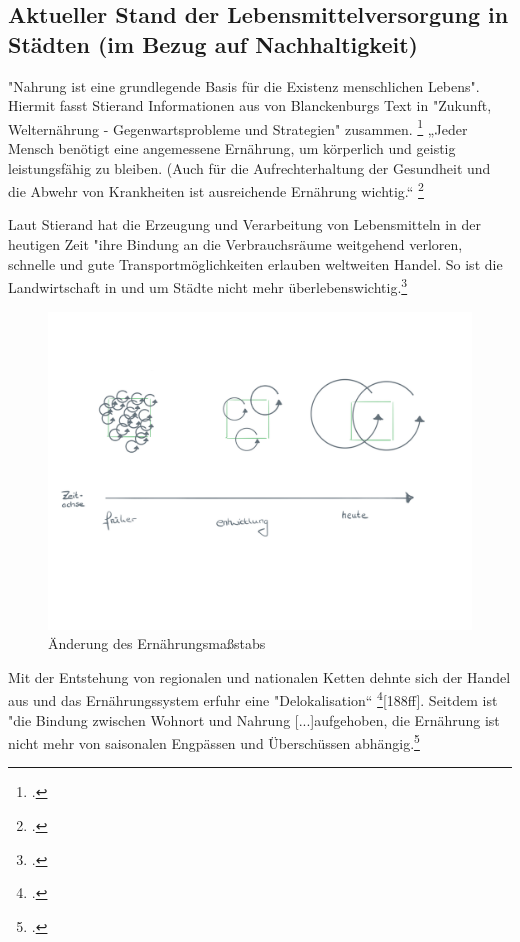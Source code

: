 \documentclass{scrartcl}
\begin{document}
\subsection{Aktueller Stand der Lebensmittelversorgung in Städten (im Bezug auf Nachhaltigkeit)} 

"Nahrung ist eine grundlegende Basis für die Existenz menschlichen Lebens". Hiermit fasst Stierand Informationen aus von Blanckenburgs Text in "Zukunft, Welternährung - Gegenwartsprobleme und Strategien" zusammen. \footcite[S.122f]{Stierand2008StadtLebensmittel} „Jeder Mensch benötigt eine angemessene Ernährung, um körperlich und geistig leistungsfähig zu bleiben. (Auch für die Aufrechterhaltung der Gesundheit und die Abwehr von Krankheiten ist ausreichende Ernährung wichtig.“ \footcite{Blanckenburg1987ZukunftDie}

Laut Stierand hat die Erzeugung und Verarbeitung von Lebensmitteln in der heutigen Zeit "ihre Bindung an die Verbrauchsräume weitgehend verloren, schnelle und gute Transportmöglichkeiten erlauben weltweiten Handel. So ist die Landwirtschaft in und um Städte nicht mehr überlebenswichtig.\footcite[S.122f]{Stierand2008StadtLebensmittel} 

\begin{figure}[htp]
\centering
\includegraphics[width=12cm]{image_folder/ernahrung.png}
\caption{Änderung des Ernährungsmaßstabs}
\label{fig:Änderung des Ernährungsmaßstabs}
\end{figure}

Mit der Entstehung von regionalen und nationalen Ketten dehnte sich der Handel aus und das Ernährungssystem erfuhr eine "Delokalisation“ \footcite{MASSIMOMONTANARI1993DerEuropa}[188ff]. Seitdem ist "die Bindung zwischen Wohnort und Nahrung [...]aufgehoben, die Ernährung ist nicht mehr von saisonalen Engpässen und Überschüssen abhängig.\footcite{Stierand2008StadtLebensmittel, S.122f}
\end{document}
